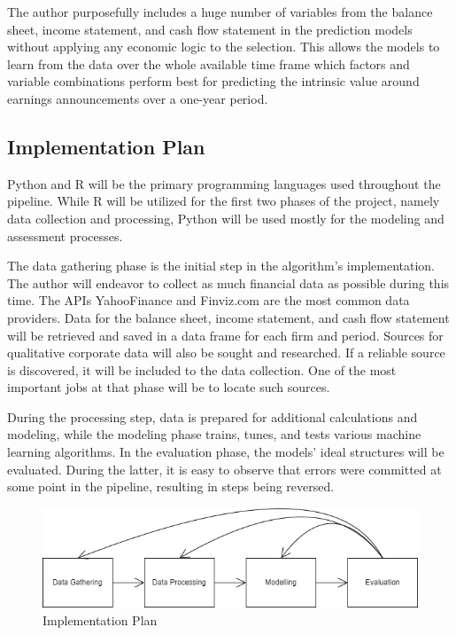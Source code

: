 \documentclass{imc-inf}
\begin{document}
The author purposefully includes a huge number of variables from the balance sheet, income statement, and cash flow statement in the prediction models without applying any economic logic to the selection. This allows the models to learn from the data over the whole available time frame which factors and variable combinations perform best for predicting the intrinsic value around earnings announcements over a one-year period.

\subsection{Implementation Plan}%

Python and R will be the primary programming languages used throughout the pipeline. While R will be utilized for the first two phases of the project, namely data collection and processing, Python will be used mostly for the modeling and assessment processes.

The data gathering phase is the initial step in the algorithm's implementation. The author will endeavor to collect as much financial data as possible during this time. The APIs YahooFinance and Finviz.com are the most common data providers. Data for the balance sheet, income statement, and cash flow statement will be retrieved and saved in a data frame for each firm and period. Sources for qualitative corporate data will also be sought and researched. If a reliable source is discovered, it will be included to the data collection. One of the most important jobs at that phase will be to locate such sources.

During the processing step, data is prepared for additional calculations and modeling, while the modeling phase trains, tunes, and tests various machine learning algorithms. In the evaluation phase, the models' ideal structures will be evaluated. During the latter, it is easy to observe that errors were committed at some point in the pipeline, resulting in steps being reversed.

\begin{figure}[h]
	\centering
	\includegraphics[width=1.0\textwidth]{resources/pipeline.drawio}
	\caption{Implementation Plan}
	\label{fig:pipeline}
\end{figure}
\end{document}
